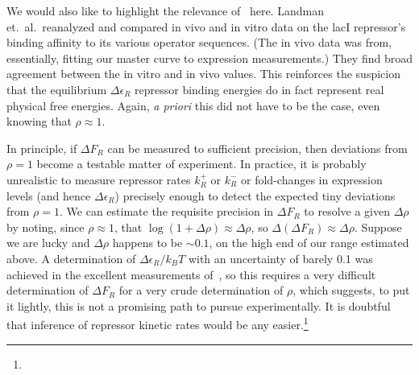 We would also like to highlight the relevance of~\cite{Landman2019} here.
Landman et.\ al.\ reanalyzed and compared in vivo and in vitro data on the lacI
repressor's binding affinity to its various operator sequences. (The in vivo
data was from, essentially, fitting our master curve to expression
measurements.) They find broad agreement between the in vitro and in vivo
values. This reinforces the suspicion that the equilibrium $\Delta\epsilon_R$
repressor binding energies do in fact represent real physical free energies.
Again, \textit{a priori} this did not have to be the case, even knowing that
$\rho\approx1$.

In principle, if $\Delta F_R$ can be measured to sufficient precision, then
deviations from $\rho=1$ become a testable matter of experiment. In practice, it
is probably unrealistic to measure repressor rates $k_R^+$ or $k_R^-$ or
fold-changes in expression levels (and hence $\Delta\epsilon_R$) precisely
enough to detect the expected tiny deviations from $\rho=1$. We can estimate the
requisite precision in $\Delta F_R$ to resolve a given $\Delta\rho$ by noting,
since $\rho\approx1$, that $\log(1+\Delta\rho)\approx \Delta\rho$, so
$\Delta(\Delta F_R) \approx \Delta\rho$. Suppose we are lucky and $\Delta\rho$
happens to be $\sim0.1$, on the high end of our range estimated above. A
determination of $\Delta\epsilon_R/k_BT$ with an uncertainty of barely 0.1 was
achieved in the excellent measurements of~\cite{Razo-Mejia2018}, so this
requires a very difficult determination of $\Delta F_R$ for a very crude
determination of $\rho$, which suggests, to put it lightly, this is not a
promising path to pursue experimentally. It is doubtful that inference of
repressor kinetic rates would be any easier.\footnote{}

